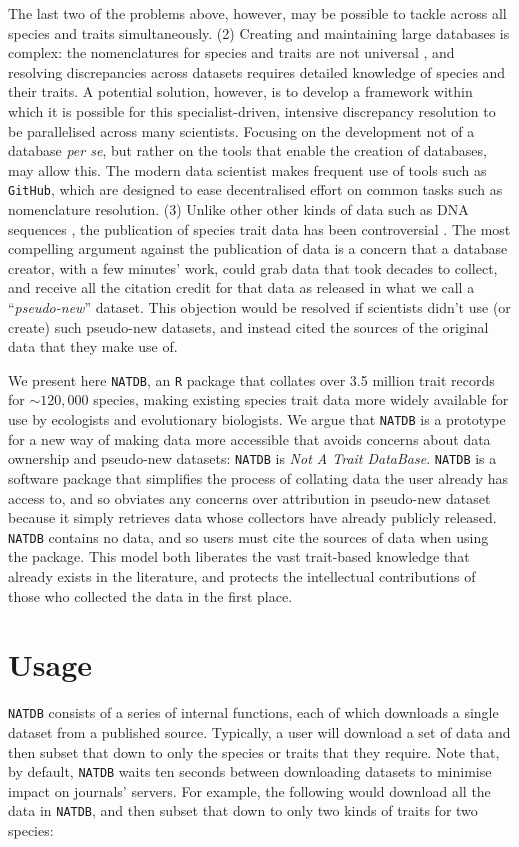 \documentclass[12pt]{report}
\newcommand{\GitHub}{\texttt{GitHub}\xspace}
\newcommand{\R}{\texttt{R}\xspace}
\newcommand{\natdb}{\texttt{NATDB}\xspace}
\begin{document}
The last two of the problems above, however, may be possible to tackle
across all species and traits simultaneously. (2) Creating and
maintaining large databases is complex: the nomenclatures for species
and traits are not universal \autocite{Kattge2011,Hudson2017}, and
resolving discrepancies across datasets requires detailed knowledge of
species and their traits. A potential solution, however, is to develop
a framework within which it is possible for this specialist-driven,
intensive discrepancy resolution to be parallelised across many
scientists. Focusing on the development not of a database \emph{per
  se}, but rather on the tools that enable the creation of databases,
may allow this. The modern data scientist makes frequent use of tools
such as \GitHub \autocite[reviewed in][]{Ram2013}, which are designed
to ease decentralised effort on common tasks such as nomenclature
resolution. (3) Unlike other other kinds of data such as DNA sequences
\autocite{Benson2013}, the publication of species trait data has been
controversial \autocite[\emph{e.g.},][]{Moles2013,Poisot2013}. The
most compelling argument against the publication of data is a concern
that a database creator, with a few minutes' work, could grab data
that took decades to collect, and receive all the citation credit for
that data as released in what we call a ``\emph{pseudo-new}''
dataset. This objection would be resolved if scientists didn't use (or
create) such pseudo-new datasets, and instead cited the sources of the
original data that they make use of.

We present here \natdb, an \R package that collates over 3.5 million
trait records for $\mathtt{\sim}120,000$ species, making existing
species trait data more widely available for use by ecologists and
evolutionary biologists. We argue that \natdb is a prototype for a new
way of making data more accessible that avoids concerns about data
ownership and pseudo-new datasets: \natdb is \emph{Not A Trait
  DataBase}. \natdb is a software package that simplifies the process
of collating data the user already has access to, and so obviates any
concerns over attribution in pseudo-new dataset because it simply
retrieves data whose collectors have already publicly released. \natdb
contains no data, and so users must cite the sources of data when
using the package. This model both liberates the vast trait-based
knowledge that already exists in the literature, and protects the
intellectual contributions of those who collected the data in the
first place.

\clearpage
\section{Usage}
\natdb consists of a series of internal functions, each of which
downloads a single dataset from a published source. Typically, a user
will download a set of data and then subset that down to only the
species or traits that they require. Note that, by default, \natdb
waits ten seconds between downloading datasets to minimise impact on
journals' servers. For example, the following would download all the
data in \natdb, and then subset that down to only two kinds of traits
for two species:
\end{document}
